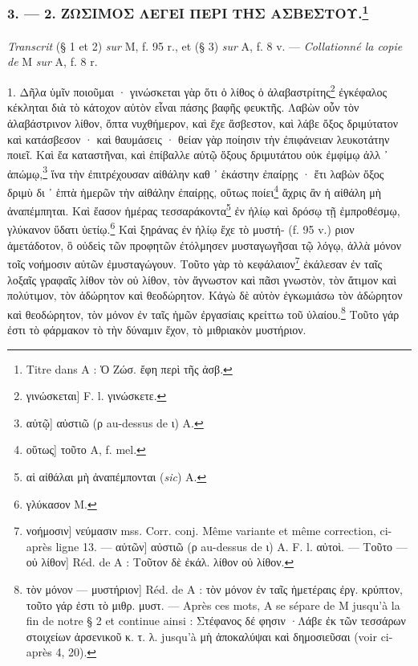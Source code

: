 \documentclass[a4paper, 11pt, oneside, polutonikogreek, french]{article}
\begin{document}
\bigskip
\centerline{\EightStarTaper}
\centerline{\EightStarTaper\EightStarTaper}
\bigskip

\subsubsection[3. --- 2. ΖΩΣΙΜΟΣ ΛΕΓΕΙ ΠΕΡΙ ΤΗΣ ΑΣΒΕΣΤΟΥ.]{3. --- 2. ΖΩΣΙΜΟΣ ΛΕΓΕΙ ΠΕΡΙ ΤΗΣ ΑΣΒΕΣΤΟΥ.\footnote{Titre dans A : Ὁ Ζώσ. ἔφη περὶ τῆς ἀσβ.}}
\paragraph{}
\emph{Transcrit} (§ 1 et 2) \emph{sur} M, f. 95 r., et (§ 3) \emph{sur} A, f. 8 v. --- \emph{Collationné la copie de} M \emph{sur} A, f. 8 r.

\bigskip

1. Δῆλα ὑμῖν ποιοῦμαι · γινώσκεται γὰρ ὅτι ὁ λίθος ὁ ἀλαβαστρίτης\footnote{γινώσκεται] F. l. γινώσκετε.} ἐγκέφαλος κέκληται διὰ τὸ κάτοχον αὐτὸν εἶναι πάσης βαφῆς φευκτῆς. Λαβὼν οὖν τὸν ἀλαβάστρινον λίθον, ὄπτα νυχθήμερον, καὶ ἔχε ἄσβεστον, καὶ λάβε ὄξος δριμύτατον καὶ κατάσβεσον · καὶ θαυμάσεις · θείαν γὰρ ποίησιν τὴν ἐπιφάνειαν λευκοτάτην ποιεῖ. Καὶ ἔα καταστῆναι, καὶ ἐπίβαλλε αὐτῷ ὄξους δριμυτάτου οὐκ ἐμφίμῳ ἀλλ ᾽ ἀπώμῳ,\footnote{αὐτῷ] αὐστιῶ (ρ au-dessus de ι) A.} ἵνα τὴν ἐπιτρέχουσαν αἰθάλην καθ ᾽ ἑκάστην ἐπαίρῃς · ἔτι λαβὼν ὄξος δριμὺ δι ᾽ ἑπτὰ ἡμερῶν τὴν αἰθάλην ἐπαίρῃς, οὕτως ποίει\footnote{οὕτως] τοῦτο A, f. mel.} ἄχρις ἂν ἡ αἰθάλη μὴ ἀναπέμπηται. Καὶ ἔασον ἡμέρας τεσσαράκοντα\footnote{αἱ αἰθάλαι μὴ ἀναπέμπονται (\emph{sic}) A.} ἐν ἡλίῳ καὶ δρόσῳ τῇ ἐμπροθέσμῳ, γλύκανον ὕδατι ὑετίῳ.\footnote{γλύκασον M.} Καὶ ξηράνας ἐν ἡλίῳ ἔχε τὸ μυστή- (f. 95 v.) ριον ἀμετάδοτον, ὃ οὐδεὶς τῶν προφητῶν ἐτόλμησεν μυσταγωγῆσαι τῷ λόγῳ, ἀλλὰ μόνον τοῖς νοήμοσιν αὐτῶν ἐμυσταγώγουν. Τοῦτο γὰρ τὸ κεφάλαιον\footnote{νοήμοσιν] νεύμασιν mss. Corr. conj. Même variante et même correction, ci-après ligne 13. --- αὐτῶν] αὐστιῶ (ρ au-dessus de ι) A. F. l. αὐτοὶ. --- Tοῦτο --- οὐ λίθον] Réd. de A : Τοῦτον δὲ ἐκάλ. λίθον οὐ λίθον.} ἐκάλεσαν ἐν ταῖς λοξαῖς γραφαῖς λίθον τὸν οὐ λίθον, τὸν ἄγνωστον καὶ πᾶσι γνωστὸν, τὸν ἄτιμον καὶ πολύτιμον, τὸν ἀδώρητον καὶ θεοδώρητον. Κἀγὼ δὲ αὐτὸν ἐγκωμιάσω τὸν ἀδώρητον καὶ θεοδώρητον, τὸν μόνον ἐν ταῖς ἡμῶν ἐργασίαις κρείττω τοῦ ὑλαίου.\footnote{τὸν μόνον --- μυστήριον] Réd. de A : τὸν μόνον ἐν ταῖς ἡμετέραις ἐργ. κρύπτον, τοῦτο γάρ ἐστι τὸ μιθρ. μυστ. --- Après ces mots, A se sépare de M jusqu'à la fin de notre § 2 et continue ainsi : Στέφανος δέ φησιν ·Λάβε ἐκ τῶν τεσσάρων στοιχείων ἀρσενικοῦ κ. τ. λ. jusqu'à μὴ ἀποκαλύψαι καὶ δημοσιεῦσαι (voir ci-après 4, 20).} Τοῦτο γάρ ἐστι τὸ φάρμακον τὸ τὴν δύναμιν ἔχον, τὸ μιθριακὸν μυστήριον.
\end{document}
